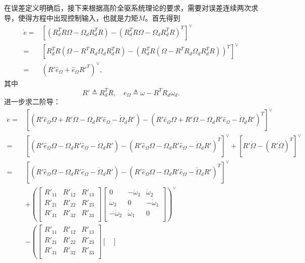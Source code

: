 在误差定义明确后，接下来根据高阶全驱系统理论的要求，需要对误差连续两次求导，使得方程中出现控制输入，也就是力矩$M$。首先得到
$$\begin{aligned}
    \dot e=&[(R_d^TR \Omega-\Omega_dR_d^TR)-(R_d^TR \Omega-\Omega_dR_d^TR)^T]^\vee\\
    =&[R_d^TR(\Omega-R^TR_d \Omega_dR_d^TR)-(R_d^TR(\Omega-R^TR_d \Omega_dR_d^TR))^T]^\vee \\
    =&(R' \hat e_\Omega  + \hat e_\Omega R'^T)^\vee,
\end{aligned} $$
其中
    $$R'\triangleq R_d^TR, \quad e_\Omega\triangleq \omega -R^TR_d \omega_d.$$
进一步求二阶导：
    $$\begin{aligned}
        \ddot e =& [(R' \hat e_\Omega \Omega + R'\dot \Omega -\Omega_d R' \hat e_\Omega -\dot \Omega_d R')-(R' \hat e_\Omega \Omega + R'\dot \Omega -\Omega_d R' \hat e_\Omega -\dot \Omega_d R')^T]^\vee\\
        =&[(R' \hat e_\Omega \Omega  -\Omega_d R' \hat e_\Omega -\dot \Omega_d R')-(R' \hat e_\Omega \Omega  -\Omega_d R' \hat e_\Omega -\dot \Omega_d R')^T]^\vee+[R'\dot \Omega-(R'\dot \Omega)^T]^\vee\\
        =&[(R' \hat e_\Omega \Omega  -\Omega_d R' \hat e_\Omega -\dot \Omega_d R')-(R' \hat e_\Omega \Omega  -\Omega_d R' \hat e_\Omega -\dot \Omega_d R')^T]^\vee\\
        & + \left(\begin{bmatrix}
        R'_{11} &R'_{12}  & R'_{13} \\
        R'_{21} & R'_{22} & R'_{23} \\
        R'_{31} & R'_{32} &R'_{33}  \\
        \end{bmatrix}\begin{bmatrix}
        0 & -\dot\omega_3 &\dot\omega_2  \\
         \dot\omega_3& 0 &  -\dot\omega_1\\
         -\dot\omega_2&\dot\omega_1  & 0 \\
        \end{bmatrix}\right)^\vee \\
        &-\left(\begin{bmatrix}
        R'_{11} &R'_{12}  & R'_{13} \\
        R'_{21} & R'_{22} & R'_{23} \\
        R'_{31} & R'_{32} &R'_{33}  \\
        \end{bmatrix}\begin{bmatrix}

\end{bmatrix}
\end{aligned}$$

